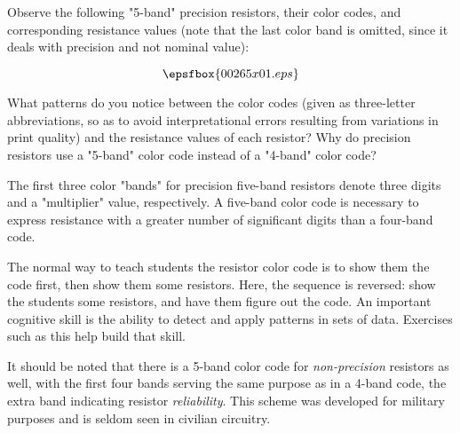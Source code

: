 

Observe the following "5-band" precision resistors, their color codes, and corresponding resistance values (note that the last color band is omitted, since it deals with precision and not nominal value):

$$\epsfbox{00265x01.eps}$$

What patterns do you notice between the color codes (given as three-letter abbreviations, so as to avoid interpretational errors resulting from variations in print quality) and the resistance values of each resistor?  Why do precision resistors use a "5-band" color code instead of a "4-band" color code?
 






The first three color "bands" for precision five-band resistors denote three digits and a "multiplier" value, respectively.  A five-band color code is necessary to express resistance with a greater number of significant digits than a four-band code.







The normal way to teach students the resistor color code is to show them the code first, then show them some resistors.  Here, the sequence is reversed: show the students some resistors, and have them figure out the code.  An important cognitive skill is the ability to detect and apply patterns in sets of data.  Exercises such as this help build that skill.

It should be noted that there is a 5-band color code for {\it non-precision} resistors as well, with the first four bands serving the same purpose as in a 4-band code, the extra band indicating resistor {\it reliability}.  This scheme was developed for military purposes and is seldom seen in civilian circuitry.




